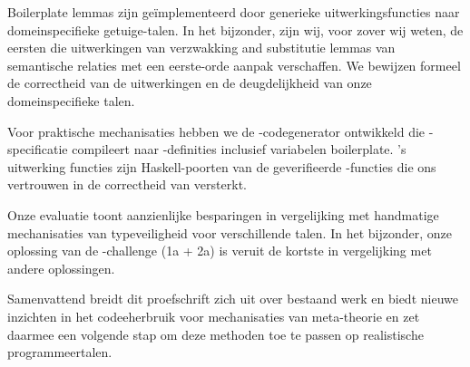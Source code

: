 Boilerplate lemmas zijn geïmplementeerd door generieke uitwerkingsfuncties naar
domeinspecifieke getuige-talen. In het bijzonder, zijn wij, voor zover wij
weten, de eersten die uitwerkingen van verzwakking and substitutie lemmas van
semantische relaties met een eerste-orde aanpak verschaffen. We bewijzen formeel
de correctheid van de uitwerkingen en de deugdelijkheid van onze
domeinspecifieke talen.

Voor praktische mechanisaties hebben we de \Needle-codegenerator ontwikkeld die
\Knot-specificatie compileert naar \Coq-definities inclusief variabelen
boilerplate. \Needle's uitwerking functies zijn Haskell-poorten van de
geverifieerde \Loom-functies die ons vertrouwen in de correctheid van \Needle
versterkt.

Onze evaluatie toont aanzienlijke besparingen in vergelijking met handmatige
\Coq mechanisaties van typeveiligheid voor verschillende talen. In het
bijzonder, onze oplossing van de \POPLmark-challenge (1a + 2a) is veruit de
kortste in vergelijking met andere oplossingen.

Samenvattend breidt dit proefschrift zich uit over bestaand werk en biedt nieuwe
inzichten in het codeeherbruik voor mechanisaties van meta-theorie en zet
daarmee een volgende stap om deze methoden toe te passen op realistische
programmeertalen.

